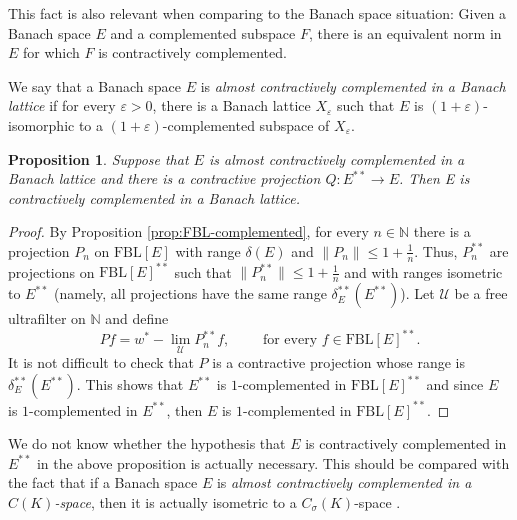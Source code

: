 \documentclass[11pt]{amsart}
\newtheorem{prop}[thm]{Proposition}
\theoremstyle{definition}
\numberwithin{equation}{section}
\newcommand{\fbl}{\text{FBL}}
\begin{document}
This fact is also relevant when comparing to the Banach space situation: Given a Banach space $E$ and a complemented subspace $F$, there is an equivalent norm in $E$ for which $F$ is contractively complemented.

We say that a Banach space $E$ is \textit{almost contractively complemented in a Banach lattice} if for every $\varepsilon>0$, there is a Banach lattice $X_\varepsilon$ such that $E$ is $(1+\varepsilon)$-isomorphic to a $(1+\varepsilon)$-complemented subspace of $X_\varepsilon$.

\begin{prop}
Suppose that $E$ is almost contractively complemented in a Banach
lattice and there is a contractive projection $Q:E^{**}\to E$. Then E is contractively complemented in a Banach lattice. 
\end{prop}
\begin{proof}
 By Proposition \ref{prop:FBL-complemented}, for every $n\in \mathbb N$ there is a projection $P_n$ on $\fbl[E]$ with range $\delta(E)$ and $\|P_n\|\leq 1+\frac{1}{n}$. Thus, $P_n^{**}$ are projections on $\fbl[E]^{**}$ such that $\|P_n^{**}\|\leq 1+\frac{1}{n}$ and with ranges isometric to $E^{**}$ (namely, all projections have the same range $\delta_E^{**}(E^{**})$). Let $\mathcal{U}$ be a free ultrafilter on $\mathbb N$ and define
 $$
 Pf=w^*-\lim_{\mathcal{U}} P_n^{**} f, \qquad \text{ for every } f\in \fbl[E]^{**}.
 $$
It is not difficult to check that $P$ is a contractive projection whose range is $\delta_E^{**}(E^{**})$. This shows that $E^{**}$ is $1$-complemented in $\fbl[E]^{**}$ and since $E$ is $1$-complemented in $E^{**}$, then $E$ is $1$-complemented in $\fbl[E]^{**}$.
\end{proof}

We do not know whether the hypothesis that $E$ is contractively complemented in $E^{**}$ in the above proposition is actually necessary. This should be compared with the fact that if a Banach space $E$ is \textit{almost contractively complemented in a $C(K)$-space}, then it is actually isometric to a $C_\sigma(K)$-space \cite[Theorem 0.2]{AB88}.


\end{document}
